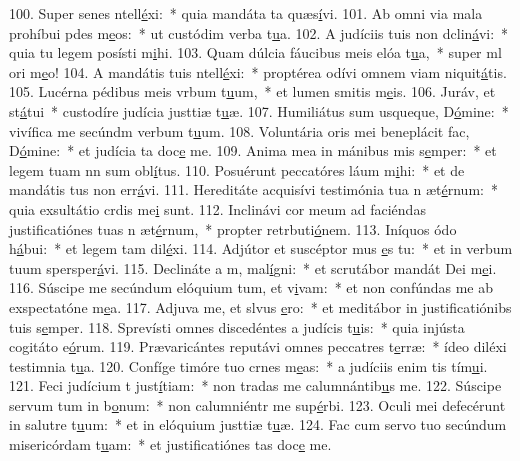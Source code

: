 100. Super senes ntell\uline{é}xi:~* quia mandáta ta quæs\uline{í}vi.
101. Ab omni via mala prohíbui pdes m\uline{e}os:~* ut custódim verba t\uline{u}a.
102. A judíciis tuis non dclin\uline{á}vi:~* quia tu legem posísti m\uline{i}hi.
103. Quam dúlcia fáucibus meis elóa t\uline{u}a,~* super ml ori m\uline{e}o!
104. A mandátis tuis ntell\uline{é}xi:~* proptérea odívi omnem viam niquit\uline{á}tis.
105. Lucérna pédibus meis vrbum t\uline{u}um,~* et lumen smitis m\uline{e}is.
106. Juráv, et st\uline{á}tui~* custodíre judícia justtiæ t\uline{u}æ.
107. Humiliátus sum usqueque, D\uline{ó}mine:~* vivífica me secúndm verbum t\uline{u}um.
108. Voluntária oris mei beneplácit fac, D\uline{ó}mine:~* et judícia ta doc\uline{e} me.
109. Anima mea in mánibus mis s\uline{e}mper:~* et legem tuam nn sum obl\uline{í}tus.
110. Posuérunt peccatóres láum m\uline{i}hi:~* et de mandátis tus non err\uline{á}vi.
111. Hereditáte acquisívi testimónia tua n æt\uline{é}rnum:~* quia exsultátio crdis me\uline{i} sunt.
112. Inclinávi cor meum ad faciéndas justificatiónes tuas n æt\uline{é}rnum,~* propter retrbuti\uline{ó}nem.
113. Iníquos ódo h\uline{á}bui:~* et legem tam dil\uline{é}xi.
114. Adjútor et suscéptor mus \uline{e}s tu:~* et in verbum tuum spersper\uline{á}vi.
115. Declináte a m, mal\uline{í}gni:~* et scrutábor mandát Dei m\uline{e}i.
116. Súscipe me secúndum elóquium tum, et v\uline{i}vam:~* et non confúndas me ab exspectatóne m\uline{e}a.
117. Adjuva me, et slvus \uline{e}ro:~* et meditábor in justificatiónibs tuis s\uline{e}mper.
118. Sprevísti omnes discedéntes a judícis t\uline{u}is:~* quia injústa cogitáto e\uline{ó}rum.
119. Prævaricántes reputávi omnes peccatres t\uline{e}rræ:~* ídeo diléxi testimnia t\uline{u}a.
120. Confíge timóre tuo crnes m\uline{e}as:~* a judíciis enim tis tím\uline{u}i.
121. Feci judícium t just\uline{í}tiam:~* non tradas me calumnántib\uline{u}s me.
122. Súscipe servum tum in b\uline{o}num:~* non calumniéntr me sup\uline{é}rbi.
123. Oculi mei defecérunt in salutre t\uline{u}um:~* et in elóquium justtiæ t\uline{u}æ.
124. Fac cum servo tuo secúndum misericórdam t\uline{u}am:~* et justificatiónes tas doc\uline{e} me.
